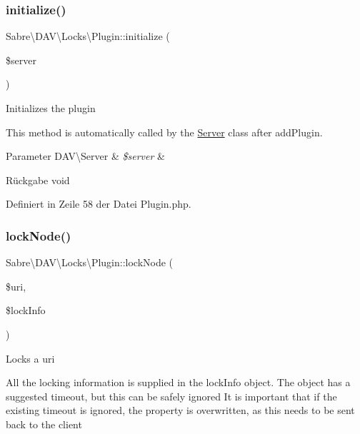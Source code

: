 \subsubsection{\texorpdfstring{initialize()}{initialize()}}
{\footnotesize\ttfamily Sabre\textbackslash{}\+D\+A\+V\textbackslash{}\+Locks\textbackslash{}\+Plugin\+::initialize (\begin{DoxyParamCaption}\item[{\mbox{\hyperlink{class_sabre_1_1_d_a_v_1_1_server}{D\+A\+V\textbackslash{}\+Server}}}]{\$server }\end{DoxyParamCaption})}

Initializes the plugin

This method is automatically called by the \mbox{\hyperlink{class_sabre_1_1_d_a_v_1_1_server}{Server}} class after add\+Plugin.


\begin{DoxyParams}[1]{Parameter}
D\+A\+V\textbackslash{}\+Server & {\em \$server} & \\
\hline
\end{DoxyParams}
\begin{DoxyReturn}{Rückgabe}
void 
\end{DoxyReturn}


Definiert in Zeile 58 der Datei Plugin.\+php.

\mbox{\label{class_sabre_1_1_d_a_v_1_1_locks_1_1_plugin_a5207b64136f89db34b5290f1c342e603}} 
\subsubsection{\texorpdfstring{lock\+Node()}{lockNode()}}
{\footnotesize\ttfamily Sabre\textbackslash{}\+D\+A\+V\textbackslash{}\+Locks\textbackslash{}\+Plugin\+::lock\+Node (\begin{DoxyParamCaption}\item[{}]{\$uri,  }\item[{\mbox{\hyperlink{class_sabre_1_1_d_a_v_1_1_locks_1_1_lock_info}{Lock\+Info}}}]{\$lock\+Info }\end{DoxyParamCaption})}

Locks a uri

All the locking information is supplied in the lock\+Info object. The object has a suggested timeout, but this can be safely ignored It is important that if the existing timeout is ignored, the property is overwritten, as this needs to be sent back to the client


